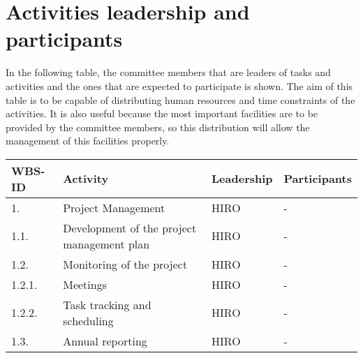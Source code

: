 \section{Activities leadership and participants}
In the following table, the committee members that are leaders of tasks and activities and the ones that are expected to participate is shown. The aim of this table is to be capable of distributing human resources and time constraints of the activities. It is also useful because the most important facilities are to be provided by the committee members, so this distribution will allow the management of this facilities properly. 

\begin{longtable}[H]{p{1.5cm} >{\raggedright\arraybackslash}p{4cm} >{\raggedright\arraybackslash}p{3.8cm} >{\raggedright\arraybackslash}p{4cm}}
	
	\toprule[2pt]
	
	\textbf{WBS-ID} &  \textbf{Activity}  & \textbf{Leadership} & \textbf{Participants} \\ 
	
	\midrule [1.5pt]
	\endhead
	
	1. & Project Management &HIRO& -\vspace{0.2cm} \\
	
	\midrule
	
	1.1. & Development of the project management plan & HIRO& -\vspace{0.2cm} \\
	
	\midrule
	
	1.2. & Monitoring of the project & HIRO & -\vspace{0.2cm} \\
	
	\midrule
	
	1.2.1. & Meetings & HIRO & -\vspace{0.2cm} \\
	
	\midrule
	
	1.2.2. & Task tracking and scheduling & HIRO & -\vspace{0.2cm} \\
	
	\midrule
	
	1.3. & Annual reporting & HIRO & -\vspace{0.2cm} \\
	
	\midrule
	

\end{longtable}
